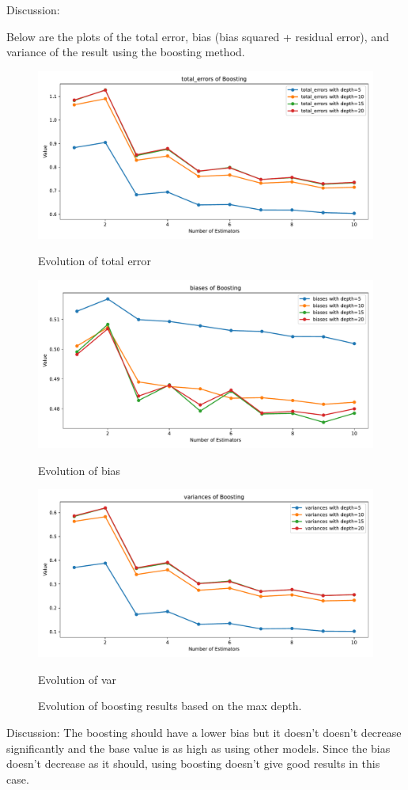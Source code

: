 \documentclass[a4paper,10pt]{article}
\begin{document}
Discussion:


Below are the plots of the total error, bias (bias squared + residual error), and variance of the result using the boosting method.

\begin{figure}[H]
    \centering 
    \begin{minipage}{0.33\textwidth}
        \centering
        \includegraphics[width=\linewidth]{images/2.5_total_error_boosting.pdf}
        \caption{Evolution of total error}
    \end{minipage}%
    \begin{minipage}{0.33\textwidth}
        \centering
        \includegraphics[width=\linewidth]{images/2.5_bias_boosting.pdf}
        \caption{Evolution of bias}
    \end{minipage}%
    \begin{minipage}{0.33\textwidth}
        \centering
        \includegraphics[width=\linewidth]{images/2.5_var_boosting.pdf}
        \caption{Evolution of var}
    \end{minipage}
    \caption{Evolution of boosting results based on the max depth.}
\end{figure}

Discussion:
The boosting should have a lower bias but it doesn't doesn't decrease significantly and the base value is as high as using other models. Since the bias doesn't decrease as it should, using boosting doesn't give good results in this case.
\end{document}
